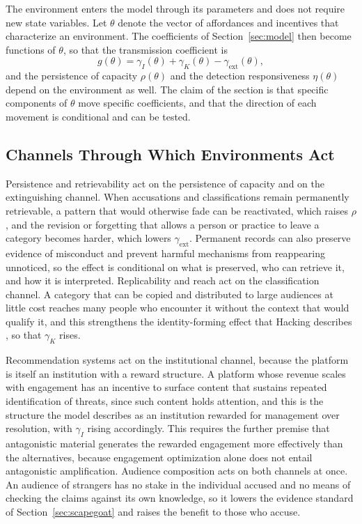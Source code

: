 \documentclass[12pt]{article}
\theoremstyle{remark}
\begin{document}
The environment enters the model through its parameters and does not require new state variables. Let $\theta$ denote the vector of affordances and incentives that characterize an environment. The coefficients of Section~\ref{sec:model} then become functions of $\theta$, so that the transmission coefficient is
\begin{equation}
g(\theta) = \gamma_I(\theta) + \gamma_K(\theta) - \gamma_{\mathrm{ext}}(\theta),
\end{equation}
and the persistence of capacity $\rho(\theta)$ and the detection responsiveness $\eta(\theta)$ depend on the environment as well. The claim of the section is that specific components of $\theta$ move specific coefficients, and that the direction of each movement is conditional and can be tested.

\subsection{Channels Through Which Environments Act}

Persistence and retrievability act on the persistence of capacity and on the extinguishing channel. When accusations and classifications remain permanently retrievable, a pattern that would otherwise fade can be reactivated, which raises $\rho$, and the revision or forgetting that allows a person or practice to leave a category becomes harder, which lowers $\gamma_{\mathrm{ext}}$. Permanent records can also preserve evidence of misconduct and prevent harmful mechanisms from reappearing unnoticed, so the effect is conditional on what is preserved, who can retrieve it, and how it is interpreted. Replicability and reach act on the classification channel. A category that can be copied and distributed to large audiences at little cost reaches many people who encounter it without the context that would qualify it, and this strengthens the identity-forming effect that Hacking describes \cite{hacking1995}, so that $\gamma_K$ rises.

Recommendation systems act on the institutional channel, because the platform is itself an institution with a reward structure. A platform whose revenue scales with engagement has an incentive to surface content that sustains repeated identification of threats, since such content holds attention, and this is the structure the model describes as an institution rewarded for management over resolution, with $\gamma_I$ rising accordingly. This requires the further premise that antagonistic material generates the rewarded engagement more effectively than the alternatives, because engagement optimization alone does not entail antagonistic amplification. Audience composition acts on both channels at once. An audience of strangers has no stake in the individual accused and no means of checking the claims against its own knowledge, so it lowers the evidence standard of Section~\ref{sec:scapegoat} and raises the benefit to those who accuse.
\end{document}

